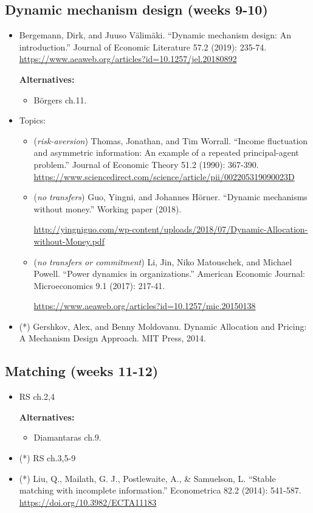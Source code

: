 \documentclass{article}
\begin{document}
\subsection{Dynamic mechanism design (weeks 9-10)}
\begin{itemize}
	\item Bergemann, Dirk, and Juuso Välimäki. ``Dynamic mechanism design: An introduction.'' Journal of Economic Literature 57.2 (2019): 235-74. 
	\url{https://www.aeaweb.org/articles?id=10.1257/jel.20180892}
	
	\textbf{Alternatives:}
	\begin{itemize}
		\item B{\"o}rgers ch.11.
	\end{itemize}
	\item Topics:
	\begin{itemize}
		\item (\emph{risk-aversion}) Thomas, Jonathan, and Tim Worrall. ``Income fluctuation and asymmetric information: An example of a repeated principal-agent problem.'' Journal of Economic Theory 51.2 (1990): 367-390. \url{https://www.sciencedirect.com/science/article/pii/002205319090023D}
		\item (\emph{no transfers}) Guo, Yingni, and Johannes Hörner. ``Dynamic mechanisms without money.'' Working paper (2018). 
		
		\url{http://yingniguo.com/wp-content/uploads/2018/07/Dynamic-Allocation-without-Money.pdf}
		\item (\emph{no transfers or commitment}) Li, Jin, Niko Matouschek, and Michael Powell. ``Power dynamics in organizations.'' American Economic Journal: Microeconomics 9.1 (2017): 217-41.
		
		\url{https://www.aeaweb.org/articles?id=10.1257/mic.20150138}
	\end{itemize}
	\item (*) Gershkov, Alex, and Benny Moldovanu. Dynamic Allocation and Pricing: A Mechanism Design Approach. MIT Press, 2014. 
\end{itemize}

\subsection{Matching (weeks 11-12)}
\begin{itemize}
	\item RS ch.2,4
	
	\textbf{Alternatives:}
	\begin{itemize}
		\item Diamantaras ch.9.
	\end{itemize}
	\item (*) RS ch.3,5-9
	\item (*) Liu, Q., Mailath, G. J., Postlewaite, A., \& Samuelson, L.  ``Stable matching with incomplete information.'' Econometrica 82.2 (2014): 541-587. \url{https://doi.org/10.3982/ECTA11183}
\end{itemize}
\end{document}
